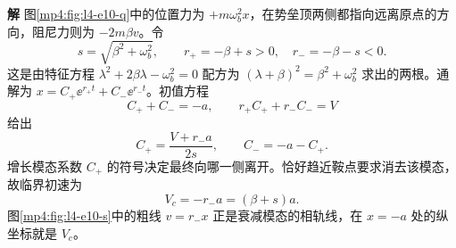 \documentclass[11pt,openany,fontset=fandol]{ctexbook}
\theoremstyle{definition}\newtheorem{example}{例}[chapter]\newtheorem{exercise}{习题}[chapter]
\newcommand{\SolutionStart}{\par\medskip\ifdim\pagetotal>0pt\ifdim\dimexpr\pagegoal-\pagetotal\relax<3\baselineskip\newpage\fi\fi\noindent\textbf{解}\quad\ignorespaces}
\newenvironment{solution}{\SolutionStart}{\par\medskip}
\begin{document}
\begin{solution}
图\ref{mp4:fig:l4-e10-q}中的位置力为 $+m\omega_b^2x$，在势垒顶两侧都指向远离原点的方向，阻尼力则为 $-2m\beta v$。令
\[
s=\sqrt{\beta^2+\omega_b^2},\qquad
r_+=-\beta+s>0,\quad r_-=-\beta-s<0.
\]
这是由特征方程 $\lambda^2+2\beta\lambda-\omega_b^2=0$ 配方为 $(\lambda+\beta)^2=\beta^2+\omega_b^2$ 求出的两根。通解为 $x=C_+\ee^{r_+t}+C_-\ee^{r_-t}$。初值方程
\[
C_++C_-=-a,\qquad r_+C_++r_-C_-=V
\]
给出
\[
C_+=\frac{V+r_-a}{2s},\qquad C_-=-a-C_+.
\]
增长模态系数 $C_+$ 的符号决定最终向哪一侧离开。恰好趋近鞍点要求消去该模态，故临界初速为
\begin{equation}\label{mp4:eq:l4-damped-threshold}
V_c=-r_-a=(\beta+s)a.
\end{equation}
图\ref{mp4:fig:l4-e10-s}中的粗线 $v=r_-x$ 正是衰减模态的相轨线，在 $x=-a$ 处的纵坐标就是 $V_c$。


\end{solution}
\end{document}
